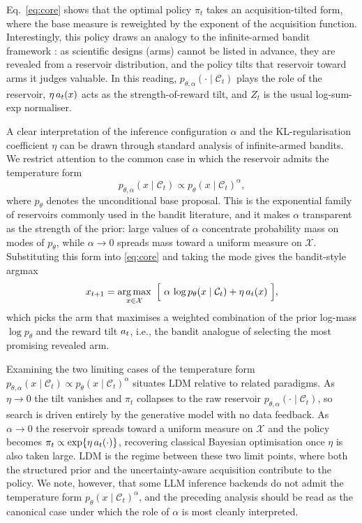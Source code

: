 Eq.~\eqref{eq:core} shows that the optimal policy $\pi_t$ takes an acquisition-tilted form, where the base measure is reweighted by the exponent of the acquisition function. Interestingly, this policy draws an analogy to the infinite-armed bandit framework \citep{berry1997bandit,wang2008infinitely}: as scientific designs (arms) cannot be listed in advance, they are revealed from a reservoir distribution, and the policy tilts that reservoir toward arms it judges valuable. In this reading, $p_{\theta,\alpha}(\cdot\mid\mathcal{C}_t)$ plays the role of the reservoir, $\eta\,a_t(x)$ acts as the strength-of-reward tilt, and $Z_t$ is the usual log-sum-exp normaliser.

A clear interpretation of the inference configuration $\alpha$ and the KL-regularisation coefficient $\eta$ can be drawn through standard analysis of infinite-armed bandits. We restrict attention to the common case in which the reservoir admits the temperature form
\begin{equation}
  \label{eq:temp}
  p_{\theta,\alpha}(x\mid\mathcal{C}_t) \propto p_\theta(x\mid\mathcal{C}_t)^\alpha,
\end{equation}
where $p_\theta$ denotes the unconditional base proposal. This is the exponential family of reservoirs commonly used in the bandit literature, and it makes $\alpha$ transparent as the strength of the prior: large values of $\alpha$ concentrate probability mass on modes of $p_\theta$, while $\alpha\to 0$ spreads mass toward a uniform measure on $\mathcal{X}$. Substituting this form into \eqref{eq:core} and taking the mode gives the bandit-style argmax
\begin{equation}
  \label{eq:argmax}
  x_{t+1}=\operatorname*{arg\,max}_{x\in\mathcal{X}}\ \Big[\ \alpha\,\log p_\theta(x\mid\mathcal{C}_t)+\eta\,a_t(x)\ \Big],
\end{equation}
which picks the arm that maximises a weighted combination of the prior log-mass $\log p_\theta$ and the reward tilt $a_t$, i.e., the bandit analogue of selecting the most promising revealed arm.

Examining the two limiting cases of the temperature form $p_{\theta,\alpha}(x\mid\mathcal{C}_t)\propto p_\theta(x\mid\mathcal{C}_t)^\alpha$ situates LDM relative to related paradigms. As $\eta\to 0$ the tilt vanishes and $\pi_t$ collapses to the raw reservoir $p_{\theta,\alpha}(\cdot\mid\mathcal{C}_t)$, so search is driven entirely by the generative model with no data feedback. As $\alpha\to0$ the reservoir spreads toward a uniform measure on $\mathcal{X}$ and the policy becomes $\pi_t\propto\exp\{\eta\,a_t(\cdot)\}$, recovering classical Bayesian optimisation once $\eta$ is also taken large. LDM is the regime between these two limit points, where both the structured prior and the uncertainty-aware acquisition contribute to the policy. We note, however, that some LLM inference backends do not admit the temperature form $p_\theta(x\mid\mathcal{C}_t)^\alpha$, and the preceding analysis should be read as the canonical case under which the role of $\alpha$ is most cleanly interpreted.

